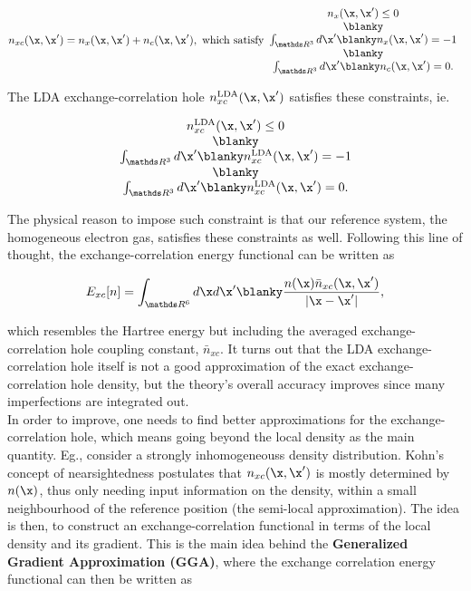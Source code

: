\documentclass{homework}
\begin{document}
$$
n_{xc}(\x, \x') = n_{x}(\x, \x') + n_{c}(\x, \x'), \textnormal{ which satisfy} \begin{array}{c}
     n_{x}(\x, \x') \leq 0  \\
     \blanky \\
     \int_{\R^{3}} d\x' \blanky n_{x}(\x, \x') = -1\\
     \blanky \\
     \int_{\R^{3}} d\x' \blanky n_{c}(\x, \x') = 0.
\end{array}
$$

The LDA exchange-correlation hole $n_{xc}^{\textnormal{LDA}}(\x,\x')$ satisfies these constraints, ie.

$$
\begin{array}{c}
     n_{xc}^{\textnormal{LDA}}(\x,\x') \leq 0  \\
     \blanky \\
     \int_{\R^{3}} d\x' \blanky n_{xc}^{\textnormal{LDA}}(\x,\x') = -1\\
     \blanky \\
     \int_{\R^{3}} d\x' \blanky n_{xc}^{\textnormal{LDA}}(\x,\x') = 0.
\end{array}
$$

The physical reason to impose such constraint is that our reference system, the homogeneous electron gas, satisfies these constraints as well. Following this line of thought, the exchange-correlation energy functional can be written as 

\begin{equation}
    E_{xc} [n] = \int_{\R^6} d\x d\x' \blanky \frac{n(\x) \bar{n}_{xc}(\x, \x')}{|\x - \x'|},
    \label{exchange-correlation energy}
\end{equation}

which resembles the Hartree energy but including the averaged exchange-correlation hole coupling constant, $\bar n_{xc}$. It turns out that the LDA exchange-correlation hole itself is not a good approximation of the exact exchange-correlation hole density, but the theory's overall accuracy improves since many imperfections are integrated out. \\


In order to improve, one needs to find better approximations for the exchange-correlation hole, which means going beyond the local density as the main quantity. Eg., consider a strongly inhomogeneouss density distribution. Kohn's concept of nearsightedness postulates that $n_{xc}(\x, \x')$ is mostly determined by $n(\x)$, thus only needing input information on the density, within a small neighbourhood of the reference position (the semi-local approximation). The idea is then, to construct an exchange-correlation functional in terms of the local density and its gradient. This is the main idea behind the \textbf{Generalized Gradient Approximation (GGA)}, where the exchange correlation energy functional can then be written as 
\end{document}
